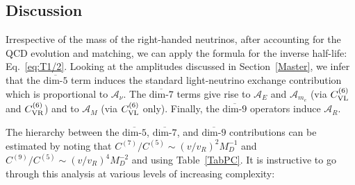 \documentclass[letterpaper,11pt]{article}
\newcommand{\textoverline}[1]{$\overline{\mbox{#1}}$}
\begin{document}
\subsection{Discussion}

Irrespective of the mass of the right-handed neutrinos, after accounting for the QCD evolution and matching, we can apply the formula for the inverse half-life: Eq.~\eqref{eq:T1/2}.
Looking at the amplitudes discussed in Section\ \ref{Master}, we infer that the   \textoverline{dim-5} term induces the standard light-neutrino exchange contribution which is proportional to $\mathcal A_\nu$. The   \textoverline{dim-7} terms give rise to $\mathcal A_E$ and $\mathcal A_{m_e}$ (via $C_{\rm VL}^{(6)}$ and $C_{\rm VR}^{(6)}$) and to $\mathcal A_M$ (via $C_{\rm VL}^{(6)}$ only). Finally,  the  \textoverline{dim-9} operators induce $\mathcal A_R$. 

The hierarchy between the \textoverline{dim-5}, \textoverline{dim-7}, and \textoverline{dim-9} contributions can be estimated 
by  noting  that  $C^{(7)}/C^{(5)}\sim (v/v_R)^2 M_D^{-1}$ and $C^{(9)}/C^{(5)}\sim (v/v_R)^4 M_D^{-2}$ 
and  using Table~\ref{TabPC}.   
It is instructive to go through this analysis at various levels of increasing complexity:
\end{document}
